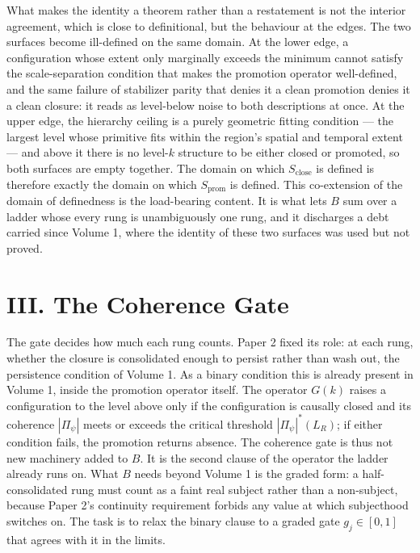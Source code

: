 \documentclass[11pt,oneside]{report}
\theoremstyle{definition}
\theoremstyle{remark}
\begin{document}
What makes the identity a theorem rather than a restatement is not the
interior agreement, which is close to definitional, but the behaviour at the
edges. The two surfaces become ill-defined on the same domain. At the lower
edge, a configuration whose extent only marginally exceeds the minimum cannot
satisfy the scale-separation condition that makes the promotion operator
well-defined, and the same failure of stabilizer parity that denies it a
clean promotion denies it a clean closure: it reads as level-below noise to
both descriptions at once. At the upper edge, the hierarchy ceiling is a
purely geometric fitting condition --- the largest level whose primitive fits
within the region's spatial and temporal extent --- and above it there is no
level-\ensuremath{k} structure to be either closed or promoted, so both
surfaces are empty together. The domain on which \ensuremath{S_{\mathrm{close}}}
is defined is therefore exactly the domain on which \ensuremath{S_{\mathrm{prom}}}
is defined. This co-extension of the domain of definedness is the load-bearing
content. It is what lets \ensuremath{B} sum over a ladder whose every rung is
unambiguously one rung, and it discharges a debt carried since Volume 1, where
the identity of these two surfaces was used but not proved.

\section*{III. The Coherence Gate}

The gate decides how much each rung counts. Paper 2 fixed its role: at each
rung, whether the closure is consolidated enough to persist rather than wash
out, the persistence condition of Volume 1. As a binary condition this is
already present in Volume 1, inside the promotion operator itself. The
operator \ensuremath{G(k)} raises a configuration to the level above only if
the configuration is causally closed and its coherence \ensuremath{|\Pi_{\psi}|}
meets or exceeds the critical threshold \ensuremath{|\Pi_{\psi}|^{*}(L_{R})};
if either condition fails, the promotion returns absence. The coherence gate
is thus not new machinery added to \ensuremath{B}. It is the second clause of
the operator the ladder already runs on. What \ensuremath{B} needs beyond
Volume 1 is the graded form: a half-consolidated rung must count as a faint
real subject rather than a non-subject, because Paper 2's continuity
requirement forbids any value at which subjecthood switches on. The task is to
relax the binary clause to a graded gate \ensuremath{g_{j} \in [0,1]} that
agrees with it in the limits.
\end{document}
